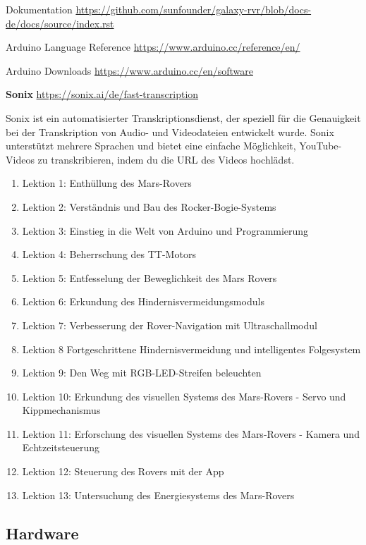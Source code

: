 \documentclass{vorlage-design-main}
\begin{document}
Dokumentation
\url{https://github.com/sunfounder/galaxy-rvr/blob/docs-de/docs/source/index.rst}

Arduino Language Reference \url{https://www.arduino.cc/reference/en/}

Arduino Downloads \url{https://www.arduino.cc/en/software}

\textbf{Sonix} \url{https://sonix.ai/de/fast-transcription}

Sonix ist ein automatisierter Transkriptionsdienst, der speziell für die
Genauigkeit bei der Transkription von Audio- und Videodateien entwickelt
wurde. Sonix unterstützt mehrere Sprachen und bietet eine einfache
Möglichkeit, YouTube-Videos zu transkribieren, indem du die URL des
Videos hochlädst.

\begin{enumerate}
\def\labelenumi{\arabic{enumi}.}

\item
  Lektion 1: Enthüllung des Mars-Rovers
\item
  Lektion 2: Verständnis und Bau des Rocker-Bogie-Systems
\item
  Lektion 3: Einstieg in die Welt von Arduino und Programmierung
\item
  Lektion 4: Beherrschung des TT-Motors
\item
  Lektion 5: Entfesselung der Beweglichkeit des Mars Rovers
\item
  Lektion 6: Erkundung des Hindernisvermeidungsmoduls
\item
  Lektion 7: Verbesserung der Rover-Navigation mit Ultraschallmodul
\item
  Lektion 8 Fortgeschrittene Hindernisvermeidung und intelligentes
  Folgesystem
\item
  Lektion 9: Den Weg mit RGB-LED-Streifen beleuchten
\item
  Lektion 10: Erkundung des visuellen Systems des Mars-Rovers - Servo
  und Kippmechanismus
\item
  Lektion 11: Erforschung des visuellen Systems des Mars-Rovers - Kamera
  und Echtzeitsteuerung
\item
  Lektion 12: Steuerung des Rovers mit der App
\item
  Lektion 13: Untersuchung des Energiesystems des Mars-Rovers
\end{enumerate}

\hypertarget{hardware}{%
\subsection{Hardware}\label{hardware}}
\end{document}
